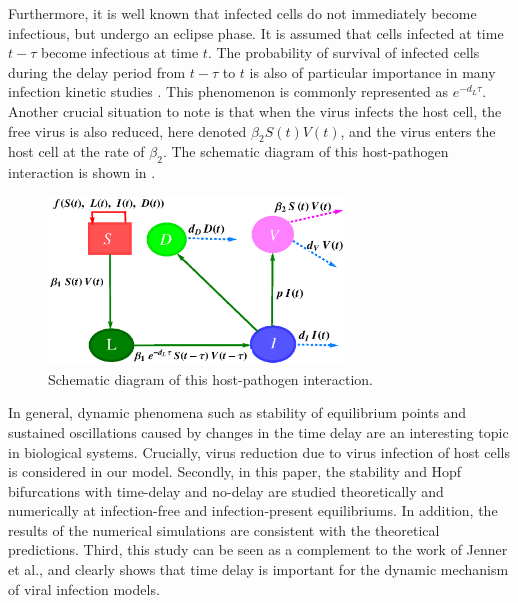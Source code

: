 \documentclass{CMHPhD-SIVD}
\begin{document}
{}

Furthermore, it is well known that infected cells do not immediately become infectious, but undergo an eclipse phase. It is assumed that cells infected at time $t-\tau$ become infectious at time $t$. The probability of survival of infected cells during the delay period from $t-\tau$ to $t$ is also of particular importance in many infection kinetic studies \cite{bera2015delay,sazonov2020viral,song2010properties,xu2011global}. This phenomenon is commonly represented as  $e^{-d_L \tau}$. Another crucial situation to note is that when the virus infects the host cell, the free virus is also reduced, here denoted $\beta_2 S(t)V(t)$, and the virus enters the host cell at the rate of $\beta_2$. The schematic diagram of this host-pathogen interaction is shown in .

\begin{figure}[h!]
\centering
\includegraphics[height=0.350\textheight,width=0.7\textwidth]{s.eps}
\vspace{3mm}
\caption{Schematic diagram of this host-pathogen interaction.}
\label{Fig.1}
\end{figure}

In general, dynamic phenomena such as stability of equilibrium points and sustained oscillations caused by changes in the time delay are an interesting topic in biological systems. {}   Crucially, virus reduction due to virus infection of host cells is considered in our model. Secondly, in this paper, the stability and Hopf bifurcations with time-delay and no-delay are studied theoretically and numerically at infection-free and infection-present equilibriums. In addition, the results of the numerical simulations are consistent with the theoretical predictions. Third, this study can be seen as a complement to the work of Jenner et al., and clearly shows that time delay is important for the dynamic mechanism of viral infection models.
\end{document}
